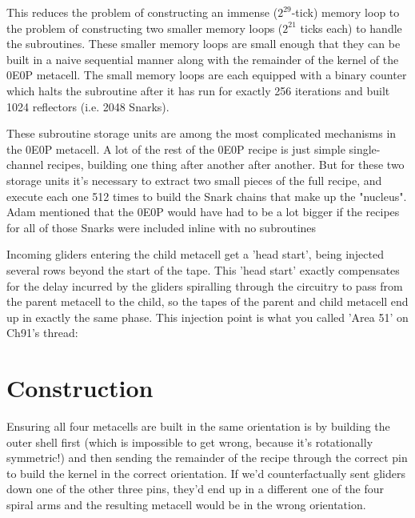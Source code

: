 This reduces the problem of constructing an immense ($2^{29}$-tick) memory loop to the problem of constructing two smaller memory loops ($2^{21}$ ticks each) to handle the subroutines. These smaller memory loops are small enough that they can be built in a naive sequential manner along with the remainder of the kernel of the 0E0P metacell. The small memory loops are each equipped with a binary counter which halts the subroutine after it has run for exactly 256 iterations and built 1024 reflectors (i.e. 2048 Snarks).

These subroutine storage units are among the most complicated mechanisms in the 0E0P metacell. A lot of the rest of the 0E0P recipe is just simple single-channel recipes, building one thing after another after another. But for these two storage units it's necessary to extract two small pieces of the full recipe, and execute each one 512 times to build the Snark chains that make up the "nucleus". Adam mentioned that the 0E0P would have had to be a lot bigger if the recipes for all of those Snarks were included inline with no subroutines

Incoming gliders entering the child metacell get a 'head start', being injected several rows beyond the start of the tape. This 'head start' exactly compensates for the delay incurred by the gliders spiralling through the circuitry to pass from the parent metacell to the child, so the tapes of the parent and child metacell end up in exactly the same phase. This injection point is what you called 'Area 51' on Ch91's thread:


\section{Construction}\label{sec:0e0p_construction}

Ensuring all four metacells are built in the same orientation is by building the outer shell first (which is impossible to get wrong, because it's rotationally symmetric!) and then sending the remainder of the recipe through the correct pin to build the kernel in the correct orientation. If we'd counterfactually sent gliders down one of the other three pins, they'd end up in a different one of the four spiral arms and the resulting metacell would be in the wrong orientation.



